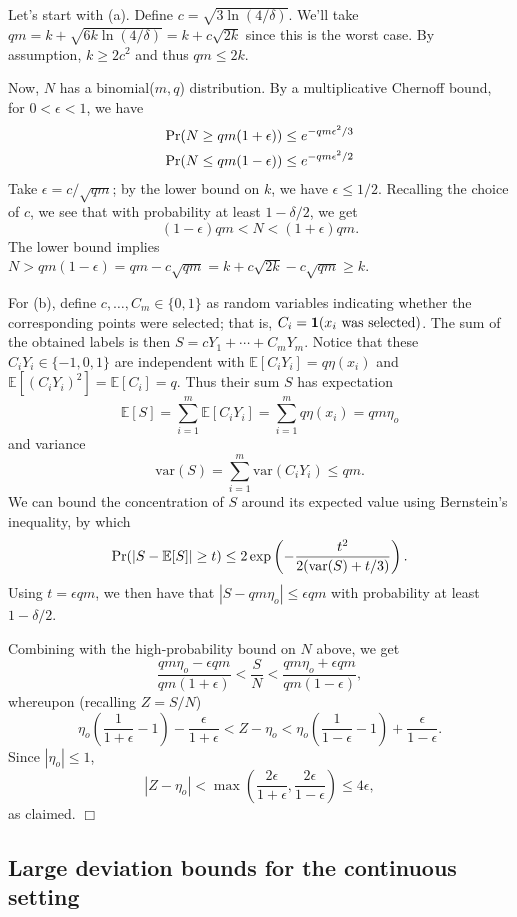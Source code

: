 \documentclass{article}
\def\pr{{\rm Pr}}
\def\E{{\mathbb E}}
\newenvironment{proof}{\noindent {\sc Proof:}}{$\Box$ \medskip}
\begin{document}
\begin{proof}
Let's start with (a). Define $c = \sqrt{3 \ln (4/\delta)}$. We'll take $qm = k + \sqrt{6k \ln (4/\delta)} = k + c \sqrt{2k}$ since this is the worst case. By assumption, $k \geq 2c^2$ and thus $qm \leq 2k$.

Now, $N$ has a binomial($m,q$) distribution. By a multiplicative Chernoff bound, for $0 < \epsilon < 1$, we have
\begin{align*}
\pr(N \geq qm(1+\epsilon)) &\leq e^{-qm\epsilon^2/3} \\
\pr(N \leq qm(1-\epsilon)) &\leq e^{-qm\epsilon^2/2}
\end{align*}
Take $\epsilon = c/\sqrt{qm}$; by the lower bound on $k$, we have $\epsilon \leq 1/2$. Recalling the choice of $c$, we see that with probability at least $1-\delta/2$, we get 
$$(1-\epsilon) qm < N < (1+\epsilon) qm .$$
The lower bound implies $N > qm(1-\epsilon) = qm - c\sqrt{qm} = k + c \sqrt{2k} - c \sqrt{qm} \geq k$.

For (b), define $c, \ldots, C_m \in \{0,1\}$ as random variables indicating whether the corresponding points were selected; that is, $C_i = {\bf 1}(\mbox{$x_i$ was selected})$. The sum of the obtained labels is then $S = c Y_1 + \cdots + C_m Y_m$. Notice that these $C_iY_i \in \{-1,0,1\}$ are independent with $\E[C_iY_i] = q \eta(x_i)$ and $\E[(C_iY_i)^2] = \E[C_i] = q$. Thus their sum $S$ has expectation
$$ \E [S] = \sum_{i=1}^m \E[C_i Y_i] = \sum_{i=1}^m q \eta(x_i) = qm \eta_o $$
and variance
$$ \mbox{var}(S) = \sum_{i=1}^m \mbox{var}(C_iY_i) \leq qm .$$
We can bound the concentration of $S$ around its expected value using Bernstein's inequality, by which
$$ \pr(|S - \E[S]| \geq t) \leq 2 \exp \left( - \frac{t^2}{2(\mbox{var}(S) + t/3)} \right) .$$
Using $t = \epsilon qm$, we then have that $|S - qm \eta_o| \leq \epsilon qm$ with probability at least $1-\delta/2$.

Combining with the high-probability bound on $N$ above, we get
$$ \frac{qm \eta_o - \epsilon qm}{qm(1+\epsilon)} < \frac{S}{N} < \frac{qm \eta_o + \epsilon qm}{qm(1-\epsilon)},$$
whereupon (recalling $Z = S/N$)
$$ 
\eta_o \left( \frac{1}{1+\epsilon} -1 \right) - \frac{\epsilon}{1+\epsilon} < Z - \eta_o < \eta_o \left( \frac{1}{1-\epsilon} - 1 \right) + \frac{\epsilon}{1-\epsilon} .$$
Since $|\eta_o| \leq 1$,
$$ |Z - \eta_o | < \max \left( \frac{2\epsilon}{1+\epsilon}, \frac{2\epsilon}{1-\epsilon} \right)
\leq 
4 \epsilon,$$
as claimed.  
\end{proof}

\subsection{Large deviation bounds for the continuous setting}
\end{document}
